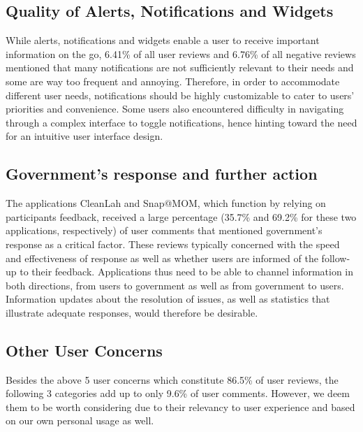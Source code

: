 \documentclass[conference,10pt]{IEEEtran}
\begin{document}
\subsection{Quality of Alerts, Notifications and Widgets}
While alerts, notifications and widgets enable a user to receive important information on the go, 6.41\% of all user reviews and 6.76\% of all negative reviews mentioned that many notifications are not sufficiently relevant to their needs and some are way too frequent and annoying. Therefore, in order to accommodate different user needs, notifications should be highly customizable to cater to users' priorities and convenience. Some users also encountered difficulty in navigating through a complex interface to toggle notifications, hence hinting toward the need for an intuitive user interface design.

\subsection{Government's response and further action}
The applications CleanLah and Snap@MOM, which function by relying on participants feedback, received a large percentage (35.7\% and 69.2\% for these two applications, respectively) of user comments that mentioned government's response as a critical factor. These reviews typically concerned with the speed and effectiveness of response as well as whether users are informed of the follow-up to their feedback. Applications thus need to be able to channel information in both directions, from users to government as well as from government to users. Information updates about the resolution of issues, as well as statistics that illustrate adequate responses, would therefore be desirable.

\subsection{Other User Concerns}

Besides the above 5 user concerns which constitute 86.5\% of user reviews, the following 3 categories add up to only 9.6\% of user comments. However, we deem them to be worth considering due to their relevancy to user experience and based on our own personal usage as well.
\end{document}
